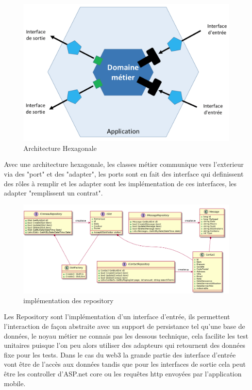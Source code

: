 \begin{figure}[!h]
    \centering
    \includegraphics[width=0.7\linewidth]{Images/hexarch}
    \caption{Architecture Hexagonale}
    \label{fig:archhexa}
\end{figure}

Avec une architecture hexagonale, les classes métier communique vers l'exterieur via des "port" et 
des "adapter", les ports sont en fait des interface qui definissent des rôles à remplir 
et les adapter sont les implémentation de ces interfaces, les adapter "remplissent un contrat".



\begin{figure}[h]
	\centering
	\includegraphics[width=1\linewidth]{Images/slotumlpart1}
	\caption{ implémentation des repository }
	\label{fig:otherrepo}
\end{figure}

Les Repository sont l'implémentation d'un interface d'entrée, ils permettent l'interaction de façon 
abstraite avec un support de persistance tel qu'une base de données, le noyau métier ne connais pas 
les dessous technique, cela facilite les test unitaires puisque l'on peu alors utiliser 
des adapteurs qui retournent des données fixe pour les tests. Dans le cas du web3 la grande 
partie des interface d'entrée vont être de l'accès aux données tandis que pour les interfaces
de sortie cela peut être les controller d'ASP.net core ou les requêtes http envoyées 
par l'application mobile. \newline


